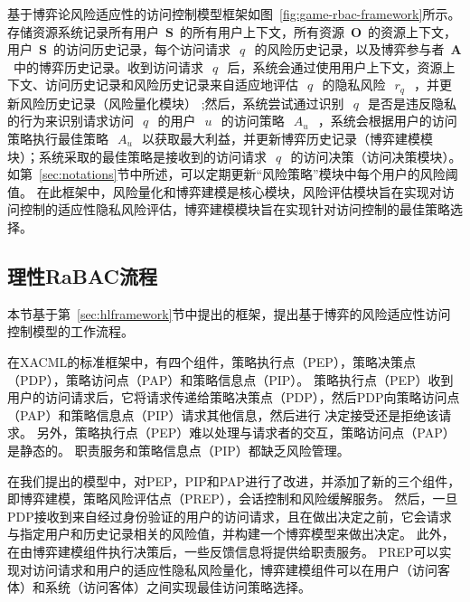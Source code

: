 基于博弈论风险适应性的访问控制模型框架如图~\ref{fig:game-rbac-framework}所示。存储资源系统记录所有用户~$\mathbf{S}$~的所有用户上下文，所有资源~$\mathbf{O}$~的资源上下文，用户~$\mathbf{S}$~的访问历史记录，每个访问请求~$~q~$~的风险历史记录，以及博弈参与者~$\mathbf{A}$~中的博弈历史记录。收到访问请求~$~q~$~后，系统会通过使用用户上下文，资源上下文、访问历史记录和风险历史记录来自适应地评估~$~q~$~的隐私风险~$~r_q~$~，并更新风险历史记录（风险量化模块） ;然后，系统尝试通过识别~$~q~$~是否是违反隐私的行为来识别请求访问~$~q~$~的用户~$~u~$~的访问策略~$~A_u~$~，系统会根据用户的访问策略执行最佳策略~$~A_u~$~以获取最大利益，并更新博弈历史记录（博弈建模模块）；系统采取的最佳策略是接收到的访问请求~$~q~$~的访问决策（访问决策模块）。如第~\ref{sec:notations}节中所述，可以定期更新“风险策略”模块中每个用户的风险阈值。
在此框架中，风险量化和博弈建模是核心模块，风险评估模块旨在实现对访问控制的适应性隐私风险评估，博弈建模模块旨在实现针对访问控制的最佳策略选择。


\subsection{理性RaBAC流程}


本节基于第~\ref{sec:hlframework}节中提出的框架，提出基于博弈的风险适应性访问控制模型的工作流程。

在XACML的标准框架中，有四个组件，策略执行点（PEP），策略决策点（PDP），策略访问点（PAP）和策略信息点（PIP）。 策略执行点（PEP）收到用户的访问请求后，它将请求传递给策略决策点（PDP），然后PDP向策略访问点（PAP）和策略信息点（PIP）请求其他信息，然后进行 决定接受还是拒绝该请求。 另外，策略执行点（PEP）难以处理与请求者的交互，策略访问点（PAP）是静态的。 职责服务和策略信息点（PIP）都缺乏风险管理。


在我们提出的模型中，对PEP，PIP和PAP进行了改进，并添加了新的三个组件，即博弈建模，策略风险评估点（PREP），会话控制和风险缓解服务。 然后，一旦PDP接收到来自经过身份验证的用户的访问请求，且在做出决定之前，它会请求与指定用户和历史记录相关的风险值，并构建一个博弈模型来做出决定。 此外，在由博弈建模组件执行决策后，一些反馈信息将提供给职责服务。 PREP可以实现对访问请求和用户的适应性隐私风险量化，博弈建模组件可以在用户（访问客体）和系统（访问客体）之间实现最佳访问策略选择。

